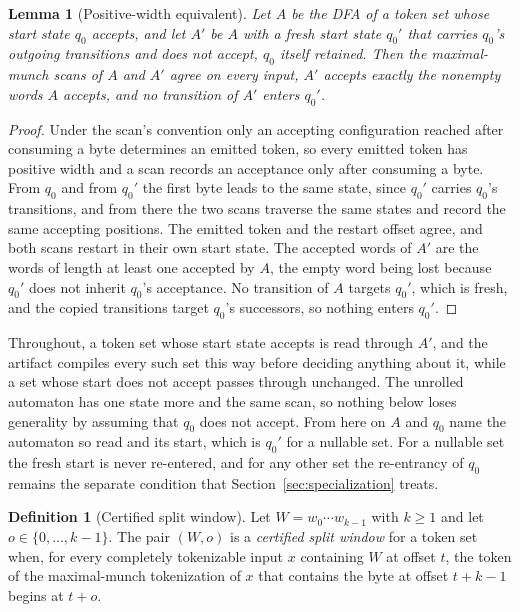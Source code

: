 \documentclass[11pt,a4paper]{article}
\theoremstyle{definition}
\newtheorem{definition}{Definition}
\theoremstyle{plain}
\newtheorem{lemma}{Lemma}
\begin{document}
\begin{lemma}[Positive-width equivalent]
\label{lem:unroll}
Let $A$ be the DFA of a token set whose start state $q_0$ accepts, and let $A'$ be $A$ with a fresh start state $q_0'$
that carries $q_0$'s outgoing transitions and does not accept, $q_0$ itself retained. Then the maximal-munch scans of
$A$ and $A'$ agree on every input, $A'$ accepts exactly the nonempty words $A$ accepts, and no transition of $A'$ enters
$q_0'$.
\end{lemma}

\begin{proof}
Under the scan's convention only an accepting configuration reached after consuming a byte determines an emitted token,
so every emitted token has positive width and a scan records an acceptance only after consuming a byte. From $q_0$ and
from $q_0'$ the first byte leads to the same state, since $q_0'$ carries $q_0$'s transitions, and from there the two
scans traverse the same states and record the same accepting positions. The emitted token and the restart offset agree,
and both scans restart in their own start state. The accepted words of $A'$ are the words of length at least one
accepted by $A$, the empty word being lost because $q_0'$ does not inherit $q_0$'s acceptance. No transition of $A$
targets $q_0'$, which is fresh, and the copied transitions target $q_0$'s successors, so nothing enters $q_0'$.
\end{proof}

Throughout, a token set whose start state accepts is read through $A'$, and the artifact compiles every such set this
way before deciding anything about it, while a set whose start does not accept passes through unchanged. The unrolled
automaton has one state more and the same scan, so nothing below loses generality by assuming that $q_0$ does not
accept. From here on $A$ and $q_0$ name the automaton so read and its start, which is $q_0'$ for a nullable set. For a
nullable set the fresh start is never re-entered, and for any other set the re-entrancy of $q_0$ remains the separate
condition that Section~\ref{sec:specialization} treats.

\begin{definition}[Certified split window]
\label{def:window}
Let $W = w_0 \cdots w_{k-1}$ with $k \geq 1$ and let $o \in \{0, \ldots, k-1\}$. The pair $(W, o)$ is a
\emph{certified split window} for a token set when, for every completely tokenizable input $x$ containing $W$ at offset
$t$, the token of the maximal-munch tokenization of $x$ that contains the byte at offset $t + k - 1$ begins at $t + o$.
\end{definition}
\end{document}
